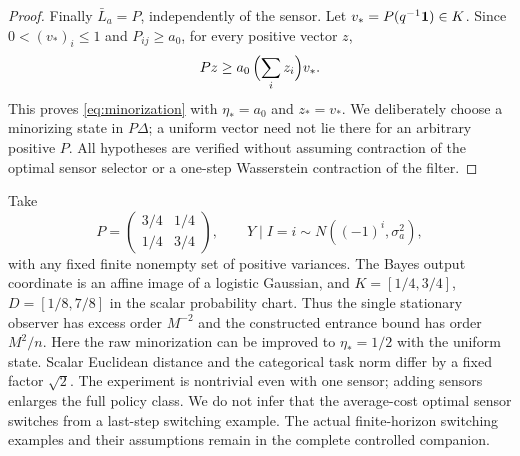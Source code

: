 \begin{proof}
Finally $\bar L_a=P$, independently of the sensor. Let $v_*=P(q^{-1}\mathbf 1)\in K$. Since $0<(v_*)_i\le1$ and $P_{ij}\ge a_0$, for every positive vector $z$,
\[
 Pz\ge a_0\,\Bigl(\sum_i z_i\Bigr)v_*.
\]
This proves \eqref{eq:minorization} with $\eta_*=a_0$ and $z_*=v_*$. We deliberately choose a minorizing state in $P\Delta$; a uniform vector need not lie there for an arbitrary positive $P$. All hypotheses are verified without assuming contraction of the optimal sensor selector or a one-step Wasserstein contraction of the filter.
\end{proof}

\begin{example}\label{ex:binary}
Take
\[
 P=\begin{pmatrix}3/4&1/4\\1/4&3/4\end{pmatrix},\qquad
 Y\mid I=i\sim N((-1)^i,\sigma_a^2),
\]
with any fixed finite nonempty set of positive variances. The Bayes output coordinate is an affine image of a logistic Gaussian, and $K=[1/4,3/4]$, $D=[1/8,7/8]$ in the scalar probability chart. Thus the single stationary observer has excess order $M^{-2}$ and the constructed entrance bound has order $M^2/n$. Here the raw minorization can be improved to $\eta_*=1/2$ with the uniform state. Scalar Euclidean distance and the categorical task norm differ by a fixed factor $\sqrt2$. The experiment is nontrivial even with one sensor; adding sensors enlarges the full policy class. We do not infer that the average-cost optimal sensor switches from a last-step switching example. The actual finite-horizon switching examples and their assumptions remain in the complete controlled companion.
\end{example}

